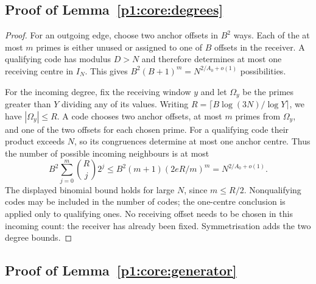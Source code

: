 \subsection{Proof of Lemma~\ref{p1:core:degrees}}
\label{p14:comp:certificate-degrees}

\begin{proof}
For an outgoing edge, choose two anchor offsets in $B^2$ ways. Each of
the at most $m$ primes is either unused or assigned to one of $B$
offsets in the receiver. A qualifying code has modulus $D>N$ and
therefore determines at most one receiving centre in $I_N$. This gives
$B^2(B+1)^m=N^{2/A_0+o(1)}$ possibilities.

For the incoming degree, fix the receiving window $y$ and let
$\Omega_y$ be the primes greater than $Y$ dividing any of its values.
Writing $R=\lceil B\log(3N)/\log Y\rceil$, we have $|\Omega_y|\le R$.
A code chooses two anchor offsets, at most $m$ primes from $\Omega_y$,
and one of the two offsets for each chosen prime. For a qualifying
code their product exceeds $N$, so its congruences determine at most
one anchor centre. Thus the number of possible incoming neighbours is
at most
\[
 B^2\sum_{j=0}^m\binom Rj2^j
 \le B^2(m+1)(2eR/m)^m
 =N^{2/A_0+o(1)}.
\]
The displayed binomial bound holds for large $N$, since $m\le R/2$.
Nonqualifying codes may be included in the number of codes; the
one-centre conclusion is applied only to qualifying ones. No receiving
offset needs to be chosen in this incoming count: the receiver has
already been fixed. Symmetrisation adds the two degree bounds.
\end{proof}

\subsection{Proof of Lemma~\ref{p1:core:generator}}
\label{p14:comp:certificate-generator}


